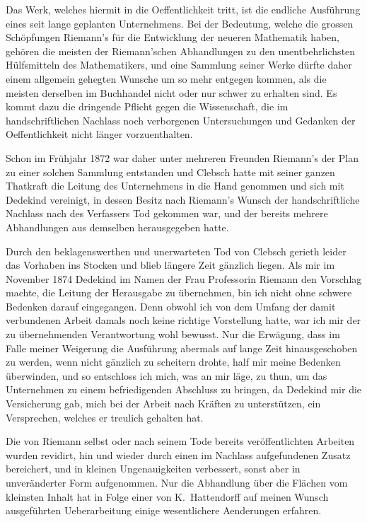 \documentclass[12pt,a4paper]{book}
\theoremstyle{definition}
\theoremstyle{remark}
\begin{document}
Das Werk, welches hiermit in die Oeffentlichkeit tritt, ist die endliche Ausf\"uhrung eines seit lange geplanten Unternehmens. Bei der Bedeutung, welche die grossen Sch\"opfungen Riemann's f\"ur die Entwicklung der neueren Mathematik haben, geh\"oren die meisten der Riemann'schen Abhandlungen zu den unentbehrlichsten H\"ulfsmitteln des Mathematikers, und eine Sammlung seiner Werke d\"urfte daher einem allgemein gehegten Wunsche um so mehr entgegen kommen, als die meisten derselben im Buchhandel nicht oder nur schwer zu erhalten sind. Es kommt dazu die dringende Pflicht gegen die Wissenschaft, die im handschriftlichen Nachlass noch verborgenen Untersuchungen und Gedanken der Oeffentlichkeit nicht l\"anger vorzuenthalten.

Schon im Fr\"uhjahr 1872 war daher unter mehreren Freunden Riemann's der Plan zu einer solchen Sammlung entstanden und Clebsch hatte mit seiner ganzen Thatkraft die Leitung des Unternehmens in die Hand genommen und sich mit Dedekind vereinigt, in dessen Besitz nach Riemann's Wunsch der handschriftliche Nachlass nach des Verfassers Tod gekommen war, und der bereits mehrere Abhandlungen aus demselben herausgegeben hatte.

Durch den beklagenswerthen und unerwarteten Tod von Clebsch gerieth leider das Vorhaben ins Stocken und blieb l\"angere Zeit g\"anzlich liegen. Als mir im November 1874 Dedekind im Namen der Frau Professorin Riemann den Vorschlag machte, die Leitung der Herausgabe zu \"ubernehmen, bin ich nicht ohne schwere Bedenken darauf eingegangen. Denn obwohl ich von dem Umfang der damit verbundenen Arbeit damals noch keine richtige Vorstellung hatte, war ich mir der zu \"ubernehmenden Verantwortung wohl bewusst. Nur die Erw\"agung, dass im Falle meiner Weigerung die Ausf\"uhrung abermals auf lange Zeit hinausgeschoben zu werden, wenn nicht g\"anzlich zu scheitern drohte, half mir meine Bedenken \"uberwinden, und so entschloss ich mich, was an mir l\"age, zu thun, um das Unternehmen zu einem befriedigenden Abschluss zu bringen, da Dedekind mir die Versicherung gab, mich bei der Arbeit nach Kr\"aften zu unterst\"utzen, ein Versprechen, welches er treulich gehalten hat.

\clearpage

Die von Riemann selbst oder nach seinem Tode bereits ver\"offentlichten Arbeiten wurden revidirt, hin und wieder durch einen im Nachlass aufgefundenen Zusatz bereichert, und in kleinen Ungenauigkeiten verbessert, sonst aber in unver\"anderter Form aufgenommen. Nur die Abhandlung \"uber die Fl\"achen vom kleinsten Inhalt hat in Folge einer von K.\ Hattendorff auf meinen Wunsch ausgef\"uhrten Ueberarbeitung einige wesentlichere Aenderungen erfahren.
\end{document}
